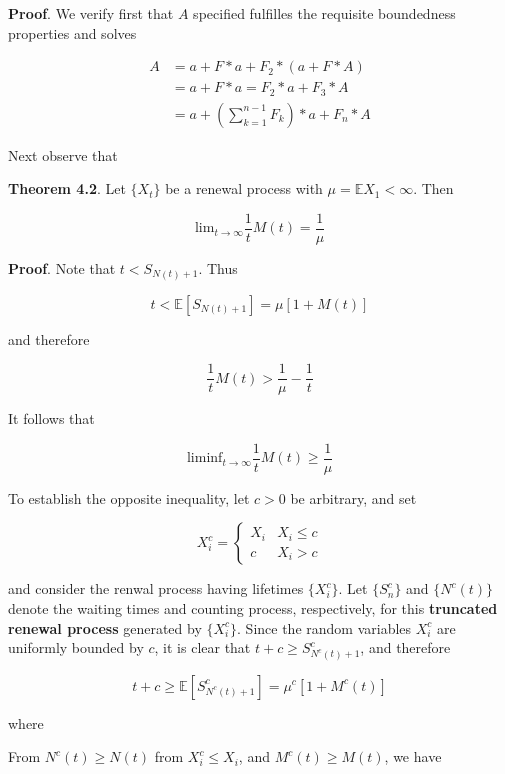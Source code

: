 \documentclass[12pt]{article}
\theoremstyle{nonumberbreak}
\begin{document}
\textbf{Proof}. We verify first that $A$ specified fulfilles the requisite boundedness properties and solves 



$$
\begin{aligned}
A &= a + F \ast a + F_2 \ast (a + F \ast A) \\[8pt]
&= a + F \ast a = F_2 \ast a + F_3 \ast A \\[8pt]
&= a + \left( \sum_{k=1}^{n-1} F_k \right) \ast a + F_n \ast A
\end{aligned}
$$


Next observe that 


\begin{theorem}
\textbf{Theorem 4.2}. Let $\{ X_t \}$ be a renewal process with $\mu = \mathbb{E} X_1 < \infty$. Then

$$
\mathrm{lim}_{t \to \infty} \frac{1}{t} M(t) = \frac{1}{\mu}
$$
\end{theorem}


\textbf{Proof}. Note that $t < S_{N(t) + 1}$. Thus 

$$
t < \mathbb{E} \left[ S_{N(t) + 1} \right] = \mu \left[ 1 + M(t) \right]
$$

and therefore

$$
\frac{1}{t} M(t) > \frac{1}{\mu} - \frac{1}{t}
$$

It follows that

$$
\mathrm{lim inf}_{t \to \infty} \frac{1}{t} M(t) \ge \frac{1}{\mu}
$$

To establish the opposite inequality, let $c > 0$ be arbitrary, and set

$$
X_i^c = \begin{cases}
X_i & X_i \le c \\
c   & X_i > c
\end{cases}
$$

and consider the renwal process having lifetimes $\{ X_i^c \}$. Let $\{ S_n^c \}$ and $\{ N^c(t) \}$ denote the waiting times and counting process, respectively, for this \textbf{truncated renewal process} generated by $\{ X_i^c \}$. Since the random variables $X_i^c$ are uniformly bounded by $c$, it is clear that $t + c \ge S^c_{N^c(t) + 1}$, and therefore

$$
t + c \ge \mathbb{E} \left[ S^c_{N^c(t) + 1} \right] = \mu^c \left[ 1 + M^c (t) \right]
$$


where 


From $N^c(t) \ge N(t)$ from $X_i^c \le X_i$, and $M^c (t) \ge M(t)$, we have
\end{document}
